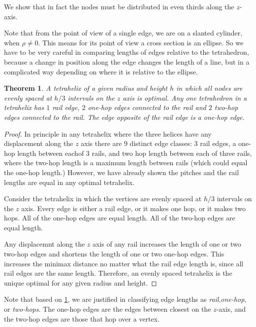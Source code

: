 \documentclass[11pt]{article}
\newtheorem{theorem}{Theorem}
\begin{document}
 We show that in fact the nodes must be distributed in even thirds along the $z$-axis.

 Note that from the point of view of a single edge, we are on a slanted cylinder, when $\rho \neq 0$.
 This means for its point of view a cross section is an ellipse. So we have to be very careful in
 comparing lengths of edges relative to the tetrahedron, because a change in position along the edge
 changes the length of a line, but in a complicated way depending on where it is relative to the ellipse.

 \begin{theorem}
   \label{eventhirds}
   A tetrahelix of a given radius and height $h$ in which all nodes are evenly spaced at $h/3$ intervals on the $z$ axis is optimal.
     Any one tetrahedron in a tetrahelix has $1$ rail edge, $2$ one-hop edges connected to the rail and $2$ two-hop edges connected to the rail.
  The edge opposite of the rail edge is a one-hop edge.
  \end{theorem}

 \begin{proof}

   In principle in any tetrahelix where the three helices have any displacement along the $z$ axis there are 9 distinct edge classes:
   3 rail edges, a one-hop length between eachof 3 rails, and two hop length between each of three rails, where the two-hop length is a maximum
   length between rails (which could equal the one-hop length.) However, we have already shown the pitches and the rail lengths are equal
   in any optimal tetrahelix.
   
    Consider the tetrahelix in which the vertices  are evenly spaced at $h/3$ intervals on the $z$ axis. Every edge is either a rail edge, or it makes one
    hop, or it makes two hops. All of the one-hop edges are equal length.  All of the two-hop edges are equal length.
    
    Any displacemnt along the $z$ axis of any rail increases the length of one or two two-hop edges and shortens the length of one or two one-hop edges.
    This increases the minimax distance no matter what the rail edge length is, since all rail edges are the same length. Therefore, an evenly spaced
    tetrahelix is the unique optimal for any given radius and height.
  \end{proof}
  

Note that based on \ref{eventhirds}, we are justified in classifying edge lengths as \emph{rail},\emph{one-hop}, or
\emph{two-hops}. The one-hop edges are the edges between closest on the $z$-axis, and the two-hop edges are those that hop over a vertex.
\end{document}
